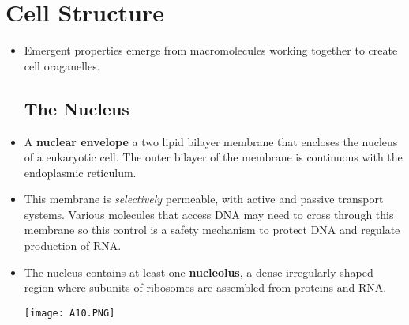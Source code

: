 \documentclass[letterpaper]{article}
\begin{document}
\section{Cell Structure}
\begin{itemize}
    \item Emergent properties emerge from macromolecules working together to create cell oraganelles.
    \subsection{The Nucleus}
    \item A \textbf{nuclear envelope} a two lipid bilayer membrane that encloses the nucleus of a eukaryotic cell. The outer bilayer of the membrane is continuous with the endoplasmic reticulum.
    \item This membrane is \textit{selectively} permeable, with active and passive transport systems. Various molecules that access DNA may need to cross through this membrane so this control is a safety mechanism to protect DNA and regulate production of RNA.
    \item The nucleus contains at least one \textbf{nucleolus}, a dense irregularly shaped region where subunits of ribosomes are assembled from proteins and RNA.
    \begin{center}\texttt{[image: A10.PNG]}\end{center}

\end{itemize}
\end{document}

